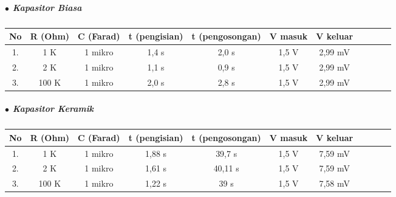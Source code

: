 \documentclass[12pt,a4paper]{article}
\begin{document}
\subparagraph*{$\bullet$ Kapasitor Biasa }
\subparagraph*{ }
\begin{tabular}{|c|c|c|c|c|c|c|c|c|c|c|}        \hline
No & R (Ohm) & C (Farad) & t (pengisian) & t (pengosongan) & V masuk & V keluar \\ \hline 
1. & 1 K  & 1 mikro & 1,4 s & 2,0 s & 1,5 V & 2,99 mV \\ \hline
2. & 2 K & 1 mikro & 1,1 s & 0,9 s & 1,5 V & 2,99 mV \\ \hline
3. & 100 K  & 1 mikro & 2,0 s & 2,8 s & 1,5 V & 2,99 mV  \\ \hline

 \end{tabular}

\subparagraph*{$\bullet$ Kapasitor Keramik }
\subparagraph*{ }
\begin{tabular}{|c|c|c|c|c|c|c|c|c|c|c|}        \hline
No & R (Ohm) & C (Farad) & t (pengisian) & t (pengosongan) & V masuk & V keluar \\ \hline 
1. & 1 K  & 1 mikro & 1,88 s & 39,7 s & 1,5 V & 7,59 mV \\ \hline
2. & 2 K & 1 mikro & 1,61 s & 40,11 s & 1,5 V & 7,59 mV \\ \hline
3. & 100 K  & 1 mikro & 1,22 s & 39 s & 1,5 V & 7,58 mV  \\ \hline

 \end{tabular}

\newpage
\end{document}
